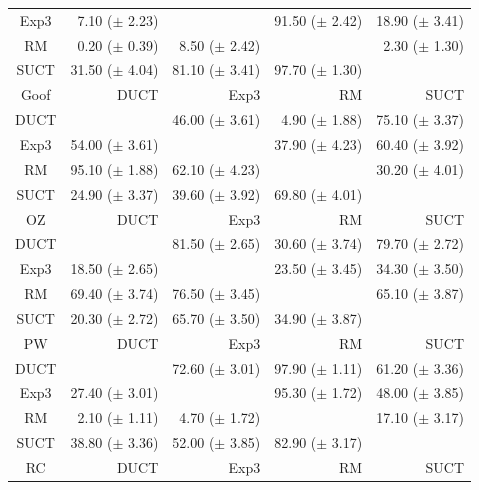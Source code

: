 \documentclass[conference]{IEEEtran}
\begin{document}
\begin{table}
\begin{center}
\begin{tabular}{|c|rrrr|}
           Exp3    & 7.10 ($\pm$ 2.23)   &          & 91.50 ($\pm$ 2.42)   & 18.90 ($\pm$ 3.41)   \\
             RM    & 0.20 ($\pm$ 0.39)   & 8.50 ($\pm$ 2.42)   &          & 2.30 ($\pm$ 1.30)   \\
           SUCT    & 31.50 ($\pm$ 4.04)   & 81.10 ($\pm$ 3.41)   & 97.70 ($\pm$ 1.30)   &          \\
\hline
\hline
      Goof         &       DUCT   &       Exp3   &         RM   &       SUCT   \\
\hline
           DUCT    &          & 46.00 ($\pm$ 3.61)   & 4.90 ($\pm$ 1.88)   & 75.10 ($\pm$ 3.37)   \\
           Exp3    & 54.00 ($\pm$ 3.61)   &          & 37.90 ($\pm$ 4.23)   & 60.40 ($\pm$ 3.92)   \\
             RM    & 95.10 ($\pm$ 1.88)   & 62.10 ($\pm$ 4.23)   &          & 30.20 ($\pm$ 4.01)   \\
           SUCT    & 24.90 ($\pm$ 3.37)   & 39.60 ($\pm$ 3.92)   & 69.80 ($\pm$ 4.01)   &          \\
\hline
\hline
       OZ   &       DUCT   &       Exp3   &         RM   &       SUCT   \\
\hline
           DUCT    &          & 81.50 ($\pm$ 2.65)   & 30.60 ($\pm$ 3.74)   & 79.70 ($\pm$ 2.72)   \\
           Exp3    & 18.50 ($\pm$ 2.65)   &          & 23.50 ($\pm$ 3.45)   & 34.30 ($\pm$ 3.50)   \\
             RM    & 69.40 ($\pm$ 3.74)   & 76.50 ($\pm$ 3.45)   &          & 65.10 ($\pm$ 3.87)   \\
           SUCT    & 20.30 ($\pm$ 2.72)   & 65.70 ($\pm$ 3.50)   & 34.90 ($\pm$ 3.87)   &          \\
\hline
\hline
   PW   &       DUCT   &       Exp3   &         RM   &       SUCT   \\
\hline
           DUCT    &          & 72.60 ($\pm$ 3.01)   & 97.90 ($\pm$ 1.11)   & 61.20 ($\pm$ 3.36)   \\
           Exp3    & 27.40 ($\pm$ 3.01)   &          & 95.30 ($\pm$ 1.72)   & 48.00 ($\pm$ 3.85)   \\
             RM    & 2.10 ($\pm$ 1.11)   & 4.70 ($\pm$ 1.72)   &          & 17.10 ($\pm$ 3.17)   \\
           SUCT    & 38.80 ($\pm$ 3.36)   & 52.00 ($\pm$ 3.85)   & 82.90 ($\pm$ 3.17)   &          \\
\hline
\hline
RC   &       DUCT   &       Exp3   &         RM   &       SUCT   \\

\end{tabular}
\end{center}
\end{table}
\end{document}
